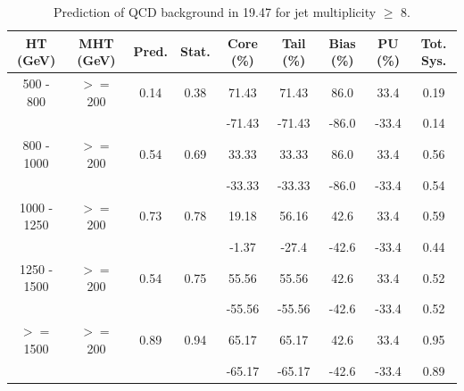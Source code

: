 \begin{table}[htbp]
 \caption{Prediction of QCD background in 19.47 \fbinv for jet multiplicity $\ge$ 8.}
 \label{tab:qcd_rs_pred_njet8}
  \begin{center}
    \begin{tabular} {c|c|c|c|c|c|c|c|c}
    \hline
    HT (GeV) & MHT (GeV) & Pred. & Stat. & Core (\%) & Tail (\%) & Bias (\%) & PU (\%)& Tot. Sys. \\
    \hline
    500 - 800 &  $>=$ 200 & 0.14 & 0.38 & 71.43 & 71.43 & 86.0 & 33.4 & 0.19 \\ 
    & & & & -71.43 & -71.43 & -86.0 & -33.4 & 0.14 \\ 
    \hline
    800 - 1000 &  $>=$ 200 & 0.54 & 0.69 & 33.33 & 33.33 & 86.0 & 33.4 & 0.56 \\ 
    & & & & -33.33 & -33.33 & -86.0 & -33.4 & 0.54 \\ 
    \hline
    1000 - 1250 &  $>=$ 200 & 0.73 & 0.78 & 19.18 & 56.16 & 42.6 & 33.4 & 0.59 \\ 
    & & & & -1.37 & -27.4 & -42.6 & -33.4 & 0.44 \\ 
    \hline
    1250 - 1500 &  $>=$ 200 & 0.54 & 0.75 & 55.56 & 55.56 & 42.6 & 33.4 & 0.52 \\ 
    & & & & -55.56 & -55.56 & -42.6 & -33.4 & 0.52 \\ 
    \hline
    $>=$ 1500 &  $>=$ 200 & 0.89 & 0.94 & 65.17 & 65.17 & 42.6 & 33.4 & 0.95 \\ 
    & & & & -65.17 & -65.17 & -42.6 & -33.4 & 0.89 \\ 
    \hline
    \end{tabular}
  \end{center}
\end{table}

